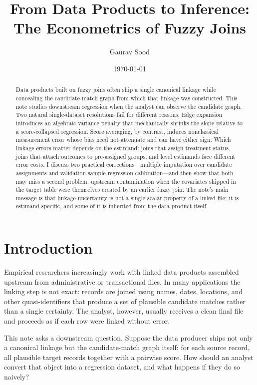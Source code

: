 \documentclass[12pt]{article}
\title{From Data Products to Inference:\\ The Econometrics of Fuzzy Joins}
\author{Gaurav Sood}
\date{\today}
\theoremstyle{remark}
\begin{document}
\maketitle

\begin{abstract}
Data products built on fuzzy joins often ship a single canonical linkage while concealing the candidate-match graph from which that linkage was constructed. This note studies downstream regression when the analyst can observe the candidate graph. Two natural single-dataset resolutions fail for different reasons. Edge expansion introduces an algebraic variance penalty that mechanically shrinks the slope relative to a score-collapsed regression. Score averaging, by contrast, induces nonclassical measurement error whose bias need not attenuate and can have either sign. Which linkage errors matter depends on the estimand: joins that assign treatment status, joins that attach outcomes to pre-assigned groups, and level estimands face different error costs. I discuss two practical corrections---multiple imputation over candidate assignments and validation-sample regression calibration---and then show that both may miss a second problem: upstream contamination when the covariates shipped in the target table were themselves created by an earlier fuzzy join. The note's main message is that linkage uncertainty is not a single scalar property of a linked file; it is estimand-specific, and some of it is inherited from the data product itself.
\end{abstract}

\section{Introduction}

Empirical researchers increasingly work with linked data products assembled upstream from administrative or transactional files. In many applications the linking step is not exact: records are joined using names, dates, locations, and other quasi-identifiers that produce a set of plausible candidate matches rather than a single certainty. The analyst, however, usually receives a clean final file and proceeds as if each row were linked without error.

This note asks a downstream question. Suppose the data producer ships not only a canonical linkage but the candidate-match graph itself: for each source record, all plausible target records together with a pairwise score. How should an analyst convert that object into a regression dataset, and what happens if they do so naively?
\end{document}
